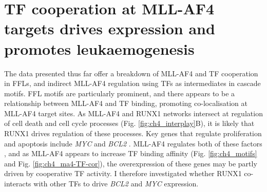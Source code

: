 \section{\label{ch4:tf-cointeraction}TF cooperation at MLL-AF4 targets drives expression and promotes leukaemogenesis}

The data presented thus far offer a breakdown of MLL-AF4 and TF cooperation in FFLs, and indirect MLL-AF4 regulation using TFs as intermediates in cascade motifs. FFL motifs are particularly prominent, and there appears to be a relationship between MLL-AF4 and TF binding, promoting co-localisation at MLL-AF4 target sites. As MLL-AF4 and RUNX1 networks intersect at regulation of cell death and cell cycle processes (Fig. \ref{fig:ch4_interplay}B), it is likely that RUNX1 drives regulation of these processes. Key genes that regulate proliferation and apoptosis include \textit{MYC} \citep{dang_myc_2012} and \textit{BCL2} \citep{kale_bcl-2_2018}. MLL-AF4 regulates both of these factors \citep{robinson_abundant_2008, benito_mll-rearranged_2015}, and as MLL-AF4 appears to increase TF binding affinity (Fig. \ref{fig:ch4_motifs} and Fig. \ref{fig:ch4_ma4-TF-cor}), the overexpression of these genes may be partly driven by cooperative TF activity. I therefore investigated whether RUNX1 co-interacts with other TFs to drive \textit{BCL2} and \textit{MYC} expression.

